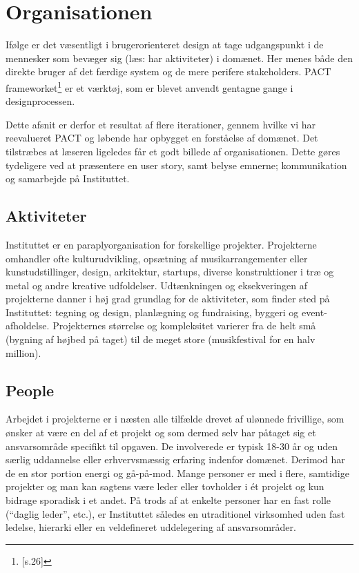\chapter{Organisationen}
Ifølge \citep{Benyon} er det væsentligt i brugerorienteret design at tage udgangspunkt i de mennesker som bevæger sig (læs: har aktiviteter) i domænet. Her menes både den direkte bruger af det færdige system og de mere perifere stakeholders. PACT frameworket\footnote{\citep{Benyon}[s.26]} er et værktøj, som er blevet anvendt gentagne gange i designprocessen. 

Dette afsnit er derfor et resultat af flere iterationer, gennem hvilke vi har reevalueret PACT og løbende har opbygget en forståelse af domænet. Det tilstræbes at læseren ligeledes får et godt billede af organisationen. Dette gøres tydeligere ved at præsentere en user story, samt belyse emnerne; kommunikation og samarbejde på Instituttet.     

\section{Aktiviteter}
Instituttet er en paraplyorganisation for forskellige projekter. Projekterne omhandler ofte kulturudvikling, opsætning af musikarrangementer eller kunstudstillinger, design, arkitektur, startups, diverse konstruktioner i træ og metal og andre kreative udfoldelser. Udtænkningen og eksekveringen af projekterne danner i høj grad grundlag for de aktiviteter, som finder sted på Instituttet: tegning og design, planlægning og fundraising, byggeri og event-afholdelse. Projekternes størrelse og kompleksitet varierer fra de helt små (bygning af højbed på taget) til de meget store (musikfestival for en halv million). 

\section{People}
Arbejdet i projekterne er i næsten alle tilfælde drevet af ulønnede frivillige, som ønsker at være en del af et projekt og som dermed selv har påtaget sig et ansvarsområde specifikt til opgaven. De involverede er typisk 18-30 år og uden særlig uddannelse eller erhvervsmæssig erfaring indenfor domænet. Derimod har de en stor portion energi og gå-på-mod. Mange personer er med i flere, samtidige projekter og man kan sagtens være leder eller tovholder i ét projekt og kun bidrage sporadisk i et andet. På trods af at enkelte personer har en fast rolle (“daglig leder”, etc.), er Instituttet således en utraditionel virksomhed uden fast ledelse, hierarki eller en veldefineret uddelegering af ansvarsområder.

